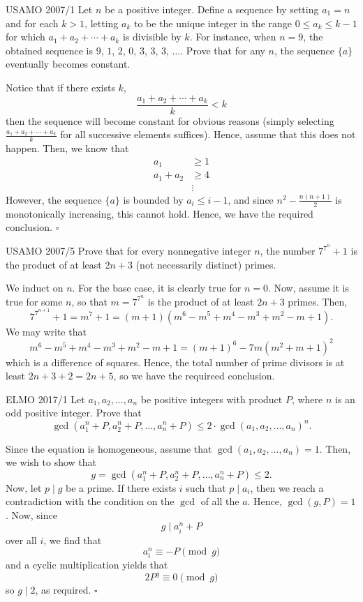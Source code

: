 \documentclass{article}
\begin{document}
\begin{problem}[1.12.16]{USAMO 2007/1}
Let $n$ be a positive integer. Define a sequence by setting $a_1 = n$ and for each $k > 1$, letting $a_k$ to be the unique integer in the range $0 \le a_k \le k - 1$ for which $a_1 + a_2 + \cdots + a_k$ is divisible by $k$. For instance, when $n = 9$, the obtained sequence is $9$, $1$, $2$, $0$, $3$, $3$, $3$, $\dots$. Prove that for any $n$, the sequence $\{a\}$ eventually becomes constant.
\end{problem}

Notice that if there exists $k$, \[\dfrac{a_1+a_2+\cdots+a_k}{k} < k\] then the sequence will become constant for obvious reasons (simply selecting $\tfrac{a_1+a_2+\cdots+a_k}{k}$ for all successive elements suffices). Hence, assume that this does not happen. Then, we know that
\begin{align*}
a_1 &\ge 1 \\
a_1+a_2 &\ge 4 \\
&\vdots
\end{align*}
However, the sequence $\{a\}$ is bounded by $a_i \le i-1$, and since $n^2 - \tfrac{n(n+1)}{2}$ is monotonically increasing, this cannot hold. Hence, we have the required conclusion. $\square$

\begin{problem}[1.12.17]{USAMO 2007/5}
Prove that for every nonnegative integer $n$, the number $7^{7^n} + 1$ is the product of at least $2n + 3$ (not necessarily distinct) primes.
\end{problem}
We induct on $n$. For the base case, it is clearly true for $n = 0$. Now, assume it is true for some $n$, so that $m = 7^{7^n}$ is the product of at least $2n + 3$ primes. Then, \[7^{7^{n+1}}+1 = m^7 + 1 = (m+1)(m^6-m^5+m^4-m^3+m^2-m+1).\] We may write that \[m^6-m^5+m^4-m^3+m^2-m+1 = (m+1)^6 - 7m(m^2+m+1)^2\] which is a difference of squares. Hence, the total number of prime divisors is at least $2n+3 + 2 = 2n+5$, so we have the requireed conclusion.

\begin{problem}[1.12.18]{ELMO 2017/1}
Let $a_1, a_2, \dots, a_n$ be positive integers with product $P$, where $n$ is an odd positive integer. Prove that \[\gcd(a_1^n + P, a_2^n + P, \dots, a_n^n+ P) \le 2 \cdot \gcd(a_1, a_2, \dots , a_n)^n.\]
\end{problem}
Since the equation is homogeneous, assume that $\gcd(a_1, a_2, \dots, a_n) = 1$. Then, we wish to show that \[g = \gcd(a_1^n + P, a_2^n + P, \dots, a_n^n+ P) \le 2.\] Now, let $p \mid g$ be a prime. If there exists $i$ such that $p \mid a_i$, then we reach a contradiction with the condition on the $\gcd$ of all the $a$. Hence, $\gcd(g, P) = 1$. Now, since \[g \mid a_i^n+P\] over all $i$, we find that \[a_i^n \equiv -P \pmod{g}\] and a cyclic multiplication yields that \[2P^g \equiv 0 \pmod{g}\] so $g \mid 2$, as required. $\square$
\end{document}
